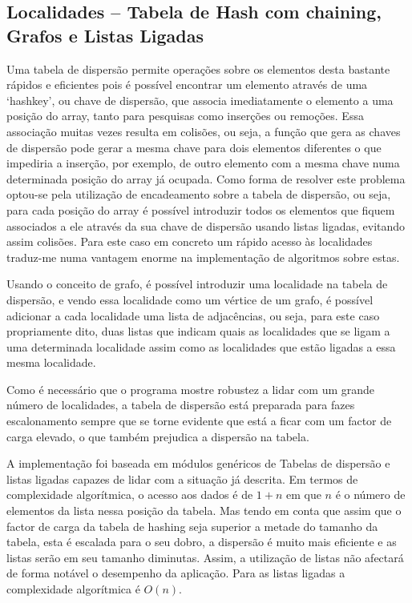 \documentclass[a5paper,twocolumn, 11pt]{article}
\begin{document}
\clearpage
\subsection[Localidades]{Localidades -- Tabela de Hash com chaining, Grafos e Listas Ligadas}
Uma tabela de dispersão permite operações sobre os elementos desta bastante rápidos e eficientes pois é possível encontrar um elemento através de uma `hashkey', ou chave de dispersão, que associa imediatamente o elemento a uma posição do array, tanto para pesquisas como inserções ou remoções. Essa associação muitas vezes resulta em colisões, ou seja, a função que gera as chaves de dispersão pode gerar a mesma chave para dois elementos diferentes o que impediria a inserção, por exemplo, de outro elemento com a mesma chave numa determinada posição do array já ocupada. Como forma de resolver este problema optou-se pela utilização de encadeamento sobre a tabela de dispersão, ou seja, para cada posição do array é possível introduzir todos os elementos que fiquem associados a ele através da sua chave de dispersão usando listas ligadas, evitando assim colisões. Para este caso em concreto um rápido acesso às localidades traduz-me numa vantagem enorme na implementação de
algoritmos sobre estas.

Usando o conceito de grafo, é possível introduzir uma localidade na tabela de dispersão, e vendo essa localidade como um vértice de um grafo, é possível adicionar a cada localidade uma lista de adjacências, ou seja, para este caso propriamente dito, duas listas que indicam quais as localidades que se ligam a uma determinada localidade assim como as localidades que estão ligadas a essa mesma localidade.

Como é necessário que o programa mostre robustez a lidar com um grande número de localidades, a tabela de dispersão está preparada para fazes escalonamento sempre que se torne evidente que está a ficar com um factor de carga elevado, o que também prejudica a dispersão na tabela.

A implementação foi baseada em módulos genéricos de Tabelas de dispersão e listas ligadas capazes de lidar com a situação já descrita. Em termos de complexidade algorítmica, o acesso aos dados é de $1+n$ em que $n$ é o número de elementos da lista nessa posição da tabela. Mas tendo em conta que assim que o factor de carga da tabela de hashing seja superior a metade do tamanho da tabela, esta é escalada para o seu dobro, a dispersão é muito mais eficiente e as listas serão em seu tamanho diminutas. Assim, a utilização de listas não afectará de forma notável o desempenho da aplicação. Para as listas ligadas a complexidade algorítmica é $O(n)$.
\end{document}
